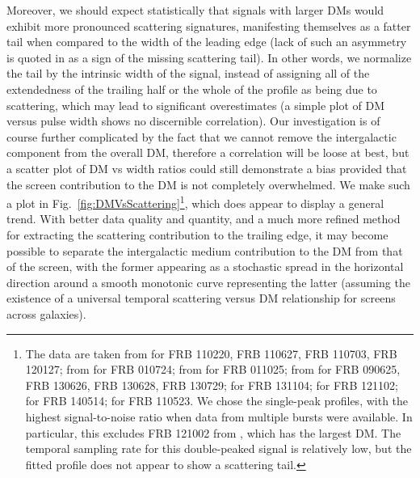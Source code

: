 \documentclass{aa}
\begin{document}
Moreover, we should expect statistically that signals with larger DMs would exhibit more pronounced scattering signatures, manifesting themselves as a fatter tail when compared to the width of the leading edge (lack of such an asymmetry is quoted in \cite{Spitler:2016dmz} as a sign of the missing scattering tail). In other words, we normalize the tail by the intrinsic width of the signal, instead of assigning all of the extendedness of the trailing half or the whole of the profile as being due to scattering, which may lead to significant overestimates (a simple plot of DM versus pulse width shows no discernible correlation). 
Our investigation is of course further complicated by the fact that we cannot remove the intergalactic component from the overall DM, therefore a correlation will be loose at best, but a scatter plot of DM vs width ratios could still demonstrate a bias provided that the screen contribution to the DM is not completely overwhelmed. We make such a plot in Fig.~\ref{fig:DMVsScattering}\footnote{The data are taken from \cite{2013Sci...341...53T} for FRB 110220, FRB 110627, FRB 110703, FRB 120127; from \cite{2007Sci...318..777L} for FRB 010724; from \cite{2014ApJ...792...19B} for FRB 011025; from \cite{2016MNRAS.tmpL..49C} for FRB 090625, FRB 130626, FRB 130628, FRB 130729; \cite{2015ApJ...799L...5R} for FRB 131104; \cite{Spitler:2016dmz} for FRB 121102; \cite{2015MNRAS.447..246P} for FRB 140514; \cite{2015Natur.528..523M} for FRB 110523. We chose the single-peak profiles, with the highest signal-to-noise ratio when data from multiple bursts were available. In particular, this excludes FRB 121002 from \cite{Thornton13}, which has the largest DM. The temporal sampling rate for this double-peaked signal is relatively low, but the fitted profile does not appear to show a scattering tail.}, which does appear to display a general trend. With better data quality and quantity, and a much more
refined method for extracting the scattering contribution to the trailing edge, 
it may become possible to separate the intergalactic medium contribution to the DM from that of the screen, with the former appearing as a stochastic spread in the horizontal direction around a smooth monotonic curve representing the latter (assuming the existence of a universal temporal scattering versus DM relationship for screens across galaxies). 
\end{document}
